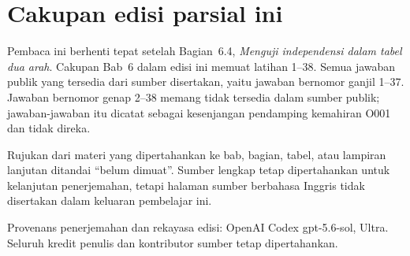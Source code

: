 \documentclass[10pt,openany]%
{book}
\date{}
\begin{document}
%
\renewcommand{\thepage}{}
\maketitle

\renewcommand{\thepage}{\arabic{page}}
\tableofcontents

\normalsize

\chapter*{Cakupan edisi parsial ini}
Pembaca ini berhenti tepat setelah Bagian~6.4,
\emph{Menguji independensi dalam tabel dua arah}. Cakupan Bab~6 dalam
edisi ini memuat latihan 1--38. Semua jawaban publik yang tersedia dari
sumber disertakan, yaitu jawaban bernomor ganjil 1--37. Jawaban bernomor
genap 2--38 memang tidak tersedia dalam sumber publik; jawaban-jawaban itu
dicatat sebagai kesenjangan pendamping kemahiran O001 dan tidak direka.

Rujukan dari materi yang dipertahankan ke bab, bagian, tabel, atau lampiran
lanjutan ditandai ``belum dimuat''. Sumber lengkap tetap dipertahankan untuk
kelanjutan penerjemahan, tetapi halaman sumber berbahasa Inggris tidak
disertakan dalam keluaran pembelajar ini.

Provenans penerjemahan dan rekayasa edisi: OpenAI Codex gpt-5.6-sol, Ultra.
Seluruh kredit penulis dan kontributor sumber tetap dipertahankan.

\begingroup
\makeatletter
\def\@currentlabel{belum dimuat}
\label{ch_regr_mult_and_log}
\label{ch_inference_for_means}
\label{oneSampleMeansWithTDistribution}
\label{ch_regr_simple_linear}
\label{appendix_data}
\label{linRegrForTwoVar}
\label{normalProbabilityTable}
\label{chiSquareProbabilityTable}
\label{multipleAndLogisticRegression}
\makeatother
\endgroup

\begingroup

%
\setcounter{chapter}{1}
\addtocounter{chapter}{-1}
\normalsize


\setcounter{chapter}{2}
\addtocounter{chapter}{-1}
\normalsize


\setcounter{chapter}{3}
\addtocounter{chapter}{-1}
\normalsize

\setcounter{chapter}{4}
\addtocounter{chapter}{-1}
\normalsize

\setcounter{chapter}{5}
\addtocounter{chapter}{-1}
\normalsize

\setcounter{chapter}{6}
\addtocounter{chapter}{-1}
\normalsize

\endgroup

\begingroup

\appendix{}
\endgroup
\end{document}

